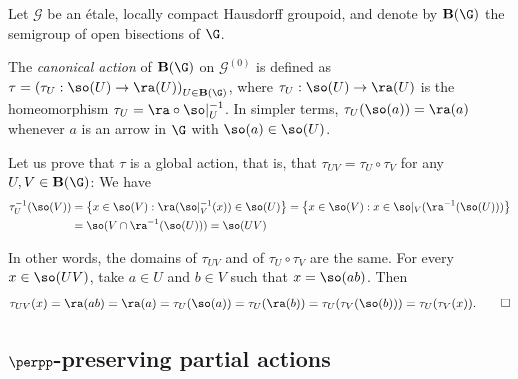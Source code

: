 \begin{example}\label{examplecanonicalaction}
Let $\mathcal{G}$ be an étale, locally compact Hausdorff groupoid, and denote by $\operatorname{\bf{B}}(\G)$ the semigroup of open bisections of $\G$.

The \emph{canonical action} of $\operatorname{\bf{B}}(\G)$ on $\mathcal{G}^{(0)}$ is defined as $\tau=\left(\tau_U:\so(U)\to\ra(U)\right)_{U\in\operatorname{\bf{B}}(\G)}$, where $\tau_U:\so(U)\to\ra(U)$ is the homeomorphism $\tau_U=\ra\circ\so|_U^{-1}$. In simpler terms, $\tau_U(\so(a))=\ra(a)$ whenever $a$ is an arrow in $\G$ with $\so(a)\in\so(U)$.

Let us prove that $\tau$ is a global action, that is, that $\tau_{UV}=\tau_U\circ\tau_V$ for any $U,V\in\operatorname{\bf{B}}(\G)$: We have
\begin{align*}
\tau_U^{-1}(\so(V))&=\left\{x\in\so(V):\ra(\so|_V^{-1}(x))\in\so(U)\right\}=\left\{x\in\so(V):x\in\so|_V(\ra^{-1}(\so(U)))\right\}\\
&=\so(V\cap\ra^{-1}(\so(U)))=\so(UV)
\end{align*}

In other words, the domains of $\tau_{UV}$ and of $\tau_U\circ\tau_V$ are the same. For every $x\in\so(UV)$, take $a\in U$ and $b\in V$ such that $x=\so(ab)$. Then
\[\tau_{UV}(x)=\ra(ab)=\ra(a)=\tau_U(\so(a))=\tau_U(\ra(b))=\tau_U(\tau_V(\so(b)))=\tau_U(\tau_V(x)).\qedhere\]
\end{example}

\subsection{$\perpp$-preserving partial actions}

